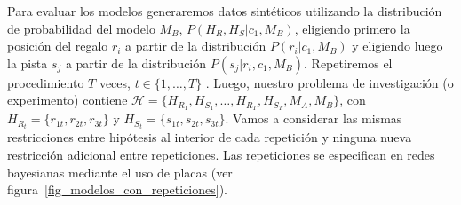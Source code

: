 \documentclass[a4paper,11pt]{book}
\theoremstyle{definition}
\begin{document}
Para evaluar los modelos generaremos datos sintéticos utilizando la distribución de probabilidad del modelo $M_B$, $P(H_R,H_S|c_1,M_B)$, eligiendo primero la posici\'on del regalo $r_i$ a partir de la distribución $P(r_i|c_1,M_B)$ y eligiendo luego la pista $s_j$ a partir de la distribución $P(s_j|r_i,c_1,M_B)$.
%
Repetiremos el procedimiento $T$ veces, $t \in \{1, \dots, T\}$ .
%
Luego, nuestro problema de investigación (o experimento) contiene $\mathcal{H} = \{H_{R_1}, H_{S_1}, \dots, H_{R_T}, H_{S_T}, M_A, M_B\}$, con $H_{R_t} = \{r_{1t}, r_{2t}, r_{3t}\}$ y $H_{S_t} = \{s_{1t}, s_{2t}, s_{3t} \}$.
%
Vamos a considerar las mismas restricciones entre hipótesis al interior de cada repetición y ninguna nueva restricción adicional entre repeticiones.
%
Las repeticiones se especifican en redes bayesianas mediante el uso de placas (ver figura~\ref{fig_modelos_con_repeticiones}).
%
\end{document}
